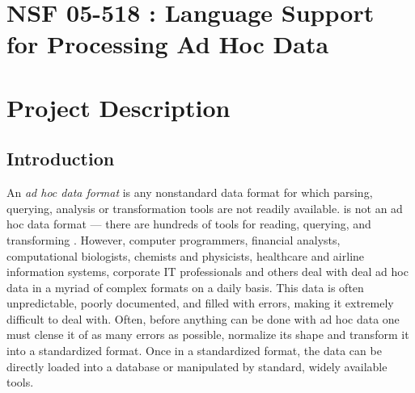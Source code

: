 \documentclass[11pt]{article}
\begin{document}
\setcounter{page}{1}
\appendix
\section{NSF 05-518 \datatype{}: Language Support for Processing Ad Hoc Data}

\newpage
\setcounter{page}{1}
\section{Project Description}

\subsection{Introduction}
\label{ssec:intro}

An {\em ad hoc data format} is any nonstandard data format for which
parsing, querying, analysis or transformation tools are not readily
available.  \xml{} is not an ad hoc data format --- there are hundreds
of tools for reading, querying, and transforming \xml{}.  However,
computer programmers, financial analysts,
computational biologists, chemists and physicists,
healthcare and airline information systems,
corporate IT professionals and 
others deal with deal ad hoc
data in a myriad of complex formats on a daily basis.
This data is often unpredictable, poorly documented, and
filled with errors, making it extremely difficult
to deal with.  Often, before anything can be done with
ad hoc data one must clense it of as many errors as possible,
normalize its shape and transform it into a standardized format. 
Once in a standardized format, the data
can be directly loaded into a database or manipulated by
standard, widely available tools.  
\end{document}
